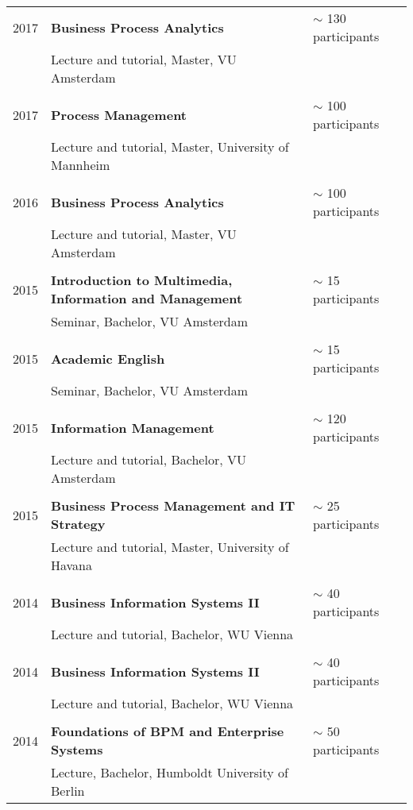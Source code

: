 \begin{tabular}{P{3cm}P{8cm}P{3cm}}	
2017		& \textbf{Business Process Analytics} 				& $\sim$ 130 participants \\
			 	& Lecture and tutorial, Master, VU Amsterdam \\
			 	\\	
2017		& \textbf{Process Management}				& $\sim$ 100 participants \\
				& Lecture and tutorial, Master, University of Mannheim \\
					\\
2016		& \textbf{Business Process Analytics} 		&		$\sim$ 100 participants \\
				& Lecture and tutorial, Master, VU Amsterdam\\
				\\
2015		& \textbf{Introduction to Multimedia, Information and Management} & 	$\sim$ 15 participants \\
				& Seminar, Bachelor, VU Amsterdam \\
				\\
2015		& \textbf{Academic English}					 	& $\sim$ 15 participants \\
				& Seminar, Bachelor, VU Amsterdam	\\ 	
				\\				
2015		& \textbf{Information Management}				& 	$\sim$ 120 participants \\
				& Lecture and tutorial, Bachelor, VU Amsterdam \\
\\				
2015		& \textbf{Business Process Management and IT Strategy}	 &  $\sim$ 25 participants \\
				& Lecture and tutorial, Master, University of Havana \\
			\\
2014	 	& \textbf{Business Information Systems II}			& $\sim$ 40 participants \\
				& Lecture and tutorial, Bachelor, WU Vienna \\				
				\\
2014		& \textbf{Business Information Systems II}				& $\sim$ 40 participants \\
				& Lecture and tutorial, Bachelor, WU Vienna \\
				\\
2014		& \textbf{Foundations of BPM and Enterprise Systems}		&  $\sim$ 50 participants \\
				& Lecture, Bachelor, Humboldt University of Berlin \\

\end{tabular}
